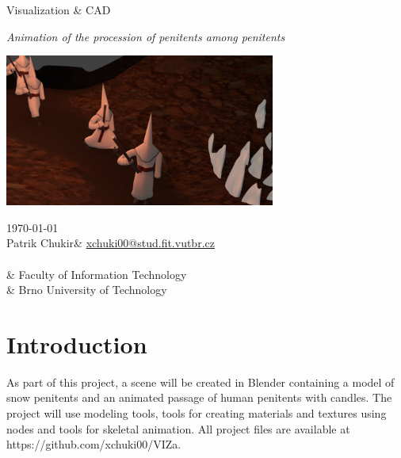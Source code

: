 \documentclass[12pt,a4paper,titlepage,final,tikz,border=4mm]{report}
\makeatletter
\newcommand\Course{Visualization \& CAD}
\newcommand\WorkTitle{Animation of the procession of penitents among penitents}
\newcommand\AuthorB{Patrik Chukir}
\newcommand\AuthorBEmail{xchuki00@stud.fit.vutbr.cz}
\newcommand\Faculty{Faculty of Information Technology}
\newcommand\School{Brno University of Technology}
\makeatother
\begin{document}
	\begin{titlepage}
	\begin{center}
		\begin{Huge}
			\Course\\
		\end{Huge}
		\bigskip
		\begin{Large}
			\textit{\WorkTitle\\}
		\end{Large}
	\end{center}
	\vfill
		\begin{center}
		\includegraphics[height=5cm]{output.png}
	\end{center}
	\vfill
	\begin{center}
		\begin{large}
			\today\\
			\AuthorB & \url{\AuthorBEmail} \\
			\\
				& \Faculty \\
				& \School \\
		\end{large}
	\end{center}

\end{titlepage}		




\tableofcontents

\newpage

\setlength{\parskip}{\baselineskip}
\setlength\parindent{0pt}

\section{Introduction}
As part of this project, a scene will be created in Blender containing a model of snow penitents and an animated passage of human penitents with candles. The project will use modeling tools, tools for creating materials and textures using nodes and tools for skeletal animation. All project files are available at https://github.com/xchuki00/VIZa. 
\end{document}
